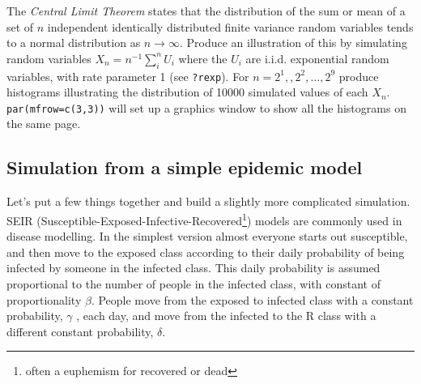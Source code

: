 \documentclass[10pt] {article}
\theoremstyle{definition}
\begin{document}
 The {\em Central Limit Theorem} states that the distribution of the sum or mean of a set of $n$ independent identically distributed finite variance random variables tends to a normal distribution as $n \to \infty$. Produce an illustration of this by simulating random variables $X_n = n^{-1} \sum_{i}^n U_i$ where the $U_i$ are i.i.d. exponential random variables, with rate parameter 1 (see {\tt ?rexp}). For $n=2^1,,2^2,\ldots,2^9$ produce histograms illustrating the distribution of 10000 simulated values of each $X_n$. \lstinline+par(mfrow=c(3,3))+ will set up a graphics window to show all the histograms on the same page.   



\subsection{Simulation from a simple epidemic model}

Let's put a few things together and build a slightly more complicated simulation. SEIR (Susceptible-Exposed-Infective-Recovered\footnote{often a euphemism for recovered or dead}) models are commonly used in disease modelling. In the simplest version almost everyone starts out susceptible, and then move to the exposed class according to their daily probability of being infected by someone in the infected class. This daily probability is assumed proportional to the number of people in the infected class, with constant of proportionality $\beta$. People move from the exposed to infected class with a constant probability, $\gamma$ , each day, and move from the infected to the R class with a different constant probability, $\delta$. 
\end{document}
